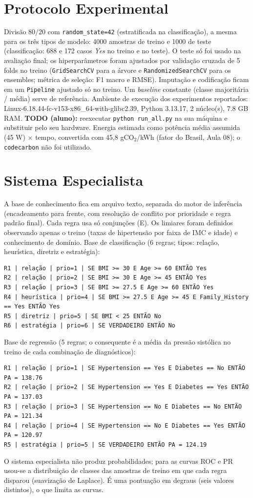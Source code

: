 \documentclass[11pt,a4paper]{article}
\begin{document}
\section{Protocolo Experimental}
Divisão 80/20 com \texttt{random\_state=42} (estratificada na classificação), a mesma para os três tipos de modelo: 4000 amostras de treino e 1000 de teste
(classificação: 688 e 172 casos \emph{Yes} no treino e no teste). O teste só foi usado na avaliação final; os
hiperparâmetros foram ajustados por validação cruzada de 5 folds no treino (\texttt{GridSearchCV} para a árvore e
\texttt{RandomizedSearchCV} para os ensembles; métrica de seleção: F1 macro e RMSE). Imputação e codificação ficam em um
\texttt{Pipeline} ajustado só no treino. Um \emph{baseline} constante (classe majoritária / média) serve de referência.
Ambiente de execução dos experimentos reportados: Linux-6.18.44-fc-v153-x86\_64-with-glibc2.39, Python 3.13.17, 2 núcleo(s), 7.8 GB RAM.
\textbf{TODO (aluno):} reexecutar \texttt{python run\_all.py} na sua máquina e substituir pelo seu hardware. Energia estimada como potência
média assumida (45 W) $\times$ tempo, convertida com 45,8 gCO$_2$/kWh (fator do Brasil, Aula 08); o \texttt{codecarbon} não foi utilizado.

\section{Sistema Especialista}
A base de conhecimento fica em arquivo texto, separada do motor de inferência (encadeamento para frente, com resolução de
conflito por prioridade e regra padrão final). Cada regra usa só conjunções (E). Os limiares foram definidos observando apenas o treino
(taxas de hipertensão por faixa de IMC e idade) e conhecimento de domínio. Base de classificação (6 regras; tipos: relação, heurística, diretriz e estratégia):
\begin{verbatim}
R1 | relação | prio=1 | SE BMI >= 30 E Age >= 60 ENTÃO Yes
R2 | relação | prio=2 | SE BMI >= 30 E Age >= 45 ENTÃO Yes
R3 | relação | prio=3 | SE BMI >= 27.5 E Age >= 60 ENTÃO Yes
R4 | heurística | prio=4 | SE BMI >= 27.5 E Age >= 45 E Family_History == Yes ENTÃO Yes
R5 | diretriz | prio=5 | SE BMI < 25 ENTÃO No
R6 | estratégia | prio=6 | SE VERDADEIRO ENTÃO No
\end{verbatim}
Base de regressão (5 regras; o consequente é a média da pressão sistólica no treino de cada combinação de diagnósticos):
\begin{verbatim}
R1 | relação | prio=1 | SE Hypertension == Yes E Diabetes == No ENTÃO PA = 138.76
R2 | relação | prio=2 | SE Hypertension == Yes E Diabetes == Yes ENTÃO PA = 137.03
R3 | relação | prio=3 | SE Hypertension == No E Diabetes == No ENTÃO PA = 121.34
R4 | relação | prio=4 | SE Hypertension == No E Diabetes == Yes ENTÃO PA = 120.97
R5 | estratégia | prio=5 | SE VERDADEIRO ENTÃO PA = 124.19
\end{verbatim}
O sistema especialista não produz probabilidades; para as curvas ROC e PR usou-se a distribuição de classes das amostras de treino em que
cada regra disparou (suavização de Laplace). É uma pontuação em degraus (seis valores distintos), o que limita as curvas.
\end{document}
